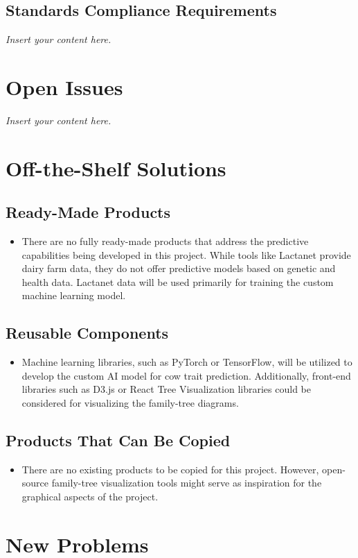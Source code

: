 \documentclass[12pt]{article}
\newcommand{\lips}{\textit{Insert your content here.}}
\begin{document}
\subsection{Standards Compliance Requirements}
\lips

\section{Open Issues}
\lips

\section{Off-the-Shelf Solutions}
\subsection{Ready-Made Products}
\begin{itemize}
  \item There are no fully ready-made products that address the predictive
  capabilities being developed in this project. While tools like Lactanet
  provide dairy farm data, they do not offer predictive models based on genetic
  and health data. Lactanet data will be used primarily for training the custom
  machine learning model.
\end{itemize}
\subsection{Reusable Components}
\begin{itemize}
  \item Machine learning libraries, such as PyTorch or TensorFlow, will be
  utilized to develop the custom AI model for cow trait prediction.
  Additionally, front-end libraries such as D3.js or React Tree Visualization
  libraries could be considered for visualizing the family-tree diagrams.
\end{itemize}
\subsection{Products That Can Be Copied}
\begin{itemize}
  \item There are no existing products to be copied for this project. However,
  open-source family-tree visualization tools might serve as inspiration for the
  graphical aspects of the project.
\end{itemize}

\section{New Problems}
\end{document}
